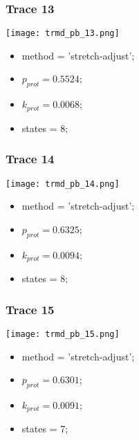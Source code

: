 \subsubsection{Trace 13}
\begin{minipage}[c]{0.7\textwidth}
	\texttt{[image: trmd\_pb\_13.png]}
\end{minipage}
\hfill
\begin{minipage}[c]{0.45\textwidth}
	\begin{itemize}
		\item method = 'stretch-adjust';
		\item $p_{prot}=0.5524$;
		\item $k_{prot}=0.0068$;
		\item states = 8;
	\end{itemize}
\end{minipage}

\subsubsection{Trace 14}
\begin{minipage}[c]{0.7\textwidth}
	\texttt{[image: trmd\_pb\_14.png]}
\end{minipage}
\hfill
\begin{minipage}[c]{0.45\textwidth}
	\begin{itemize}
		\item method = 'stretch-adjust';
		\item $p_{prot}=0.6325$;
		\item $k_{prot}=0.0094$;
		\item states = 8;
	\end{itemize}
\end{minipage}

\subsubsection{Trace 15}
\begin{minipage}[c]{0.7\textwidth}
	\texttt{[image: trmd\_pb\_15.png]}
\end{minipage}
\hfill
\begin{minipage}[c]{0.45\textwidth}
	\begin{itemize}
		\item method = 'stretch-adjust';
		\item $p_{prot}=0.6301$;
		\item $k_{prot}=0.0091$;
		\item states = 7;
	\end{itemize}
\end{minipage}


